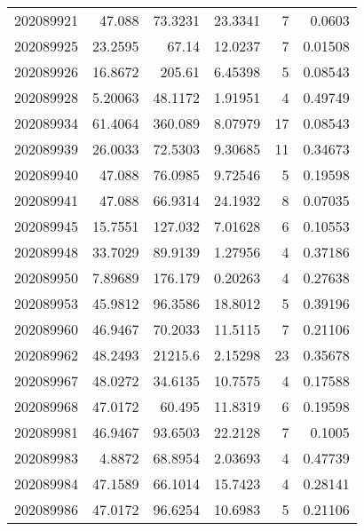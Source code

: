 \begin{tabular}{rrrrrr}
 202089921 &         47.088   &       73.3231 &           23.3341  &           7 & 0.0603  \\
 202089925 &         23.2595  &       67.14   &           12.0237  &           7 & 0.01508 \\
 202089926 &         16.8672  &      205.61   &            6.45398 &           5 & 0.08543 \\
 202089928 &          5.20063 &       48.1172 &            1.91951 &           4 & 0.49749 \\
 202089934 &         61.4064  &      360.089  &            8.07979 &          17 & 0.08543 \\
 202089939 &         26.0033  &       72.5303 &            9.30685 &          11 & 0.34673 \\
 202089940 &         47.088   &       76.0985 &            9.72546 &           5 & 0.19598 \\
 202089941 &         47.088   &       66.9314 &           24.1932  &           8 & 0.07035 \\
 202089945 &         15.7551  &      127.032  &            7.01628 &           6 & 0.10553 \\
 202089948 &         33.7029  &       89.9139 &            1.27956 &           4 & 0.37186 \\
 202089950 &          7.89689 &      176.179  &            0.20263 &           4 & 0.27638 \\
 202089953 &         45.9812  &       96.3586 &           18.8012  &           5 & 0.39196 \\
 202089960 &         46.9467  &       70.2033 &           11.5115  &           7 & 0.21106 \\
 202089962 &         48.2493  &    21215.6    &            2.15298 &          23 & 0.35678 \\
 202089967 &         48.0272  &       34.6135 &           10.7575  &           4 & 0.17588 \\
 202089968 &         47.0172  &       60.495  &           11.8319  &           6 & 0.19598 \\
 202089981 &         46.9467  &       93.6503 &           22.2128  &           7 & 0.1005  \\
 202089983 &          4.8872  &       68.8954 &            2.03693 &           4 & 0.47739 \\
 202089984 &         47.1589  &       66.1014 &           15.7423  &           4 & 0.28141 \\
 202089986 &         47.0172  &       96.6254 &           10.6983  &           5 & 0.21106 \\

\end{tabular}
